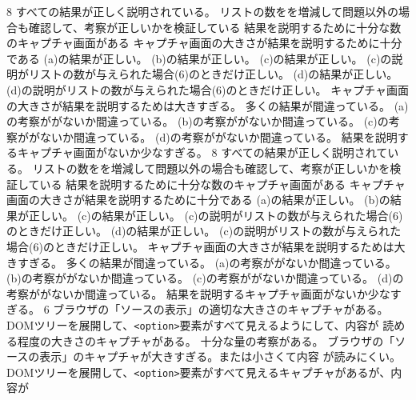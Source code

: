 \newcommand{\Elm}[1]{\texttt{<#1>}}
  \ProblemNN{


\Newpage

}
{
{}{8}
 {
 {すべての結果が正しく説明されている。}
 {リストの数をを増減して問題以外の場合も確認して、考察が正しいかを検証している}
 {結果を説明するために十分な数のキャプチャ画面がある}
 {キャプチャ画面の大きさが結果を説明するために十分である}
 }
 {
 {(a)の結果が正しい。}
 {(b)の結果が正しい。}
 {(c)の結果が正しい。}
 {(c)の説明がリストの数が与えられた場合(6)のときだけ正しい。}
 {(d)の結果が正しい。}
 {(d)の説明がリストの数が与えられた場合(6)のときだけ正しい。}
 {キャプチャ画面の大きさが結果を説明するためは大きすぎる。}
 }
 {
 {多くの結果が間違っている。}
 {(a)の考察ががないか間違っている。}
 {(b)の考察ががないか間違っている。}
 {(c)の考察ががないか間違っている。}
 {(d)の考察ががないか間違っている。}
 {結果を説明するキャプチャ画面がないか少なすぎる。}
 }
{}{8}
 {
 {すべての結果が正しく説明されている。}
 {リストの数をを増減して問題以外の場合も確認して、考察が正しいかを検証している}
 {結果を説明するために十分な数のキャプチャ画面がある}
 {キャプチャ画面の大きさが結果を説明するために十分である}
 }
 {
 {(a)の結果が正しい。}
 {(b)の結果が正しい。}
 {(c)の結果が正しい。}
 {(c)の説明がリストの数が与えられた場合(6)のときだけ正しい。}
 {(d)の結果が正しい。}
 {(c)の説明がリストの数が与えられた場合(6)のときだけ正しい。}
 {キャプチャ画面の大きさが結果を説明するためは大きすぎる。}
 }
 {
 {多くの結果が間違っている。}
 {(a)の考察ががないか間違っている。}
 {(b)の考察ががないか間違っている。}
 {(c)の考察ががないか間違っている。}
 {(d)の考察ががないか間違っている。}
 {結果を説明するキャプチャ画面がないか少なすぎる。}
 }
{}{6}
 {
 {ブラウザの「ソースの表示」の適切な大きさのキャプチャがある。}
 {DOMツリーを展開して、\Elm{option}要素がすべて見えるようにして、内容が
 読める程度の大きさのキャプチャがある。}
 {十分な量の考察がある。}
 }
 {
 {ブラウザの「ソースの表示」のキャプチャが大きすぎる。または小さくて内容
 が読みにくい。}
 {DOMツリーを展開して、\Elm{option}要素がすべて見えるキャプチャがあるが、内容が
}}}
